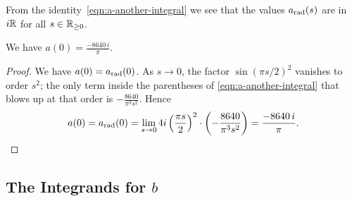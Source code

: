 From the identity~\eqref{eqn:a-another-integral} we see that the values $a_{\mathrm{rad}}(s)$ are in $i\mathbb{R}$ for all $s\in\mathbb{R}_{\geq0}$.
\begin{proposition}\label{prop:a0}\leanok
We have $a(0) = \frac{-8640\, i}{\pi}$.
\end{proposition}
\begin{proof}
We have $a(0) = a_{\mathrm{rad}}(0)$. As $s \to 0$, the factor $\sin(\pi s/2)^2$ vanishes to order $s^2$; the only term inside the parentheses of \eqref{eqn:a-another-integral} that blows up at that order is $-\frac{8640}{\pi^3 s^2}$. Hence
\[
  a(0) = a_{\mathrm{rad}}(0) = \lim_{s \to 0} 4i\left(\frac{\pi s}{2}\right)^2 \cdot \left(-\frac{8640}{\pi^3 s^2}\right) = \frac{-8640\, i}{\pi}.
\]
\end{proof}

\subsection{The Integrands for $b$}

